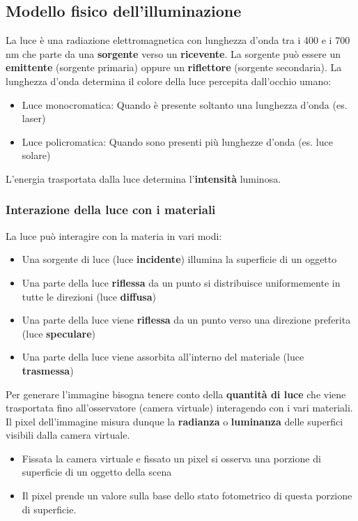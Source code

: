 \documentclass[a4paper]{article}
\begin{document}
\subsection{Modello fisico dell'illuminazione}
La luce è una radiazione elettromagnetica con lunghezza d'onda tra i 400 e i 700 nm che
parte da una \textbf{sorgente} verso un \textbf{ricevente}. La sorgente può essere
un \textbf{emittente} (sorgente primaria) oppure un \textbf{riflettore} (sorgente secondaria).
La lunghezza d'onda determina il colore della luce percepita dall'occhio umano:
\begin{itemize}
  \item Luce monocromatica: Quando è presente soltanto una lunghezza d'onda (es.
    laser)

  \item Luce policromatica: Quando sono presenti più lunghezze d'onda (es. luce solare)
\end{itemize}
L'energia trasportata dalla luce determina l'\textbf{intensità} luminosa.

\subsubsection{Interazione della luce con i materiali}
La luce può interagire con la materia in vari modi:
\begin{itemize}
  \item Una sorgente di luce (luce \textbf{incidente}) illumina la superficie di un oggetto
  \item Una parte della luce \textbf{riflessa} da un punto si distribuisce uniformemente in
    tutte le direzioni (luce \textbf{diffusa})
  \item Una parte della luce viene \textbf{riflessa} da un punto verso una direzione preferita
    (luce \textbf{speculare})
  \item Una parte della luce viene assorbita all'interno del materiale (luce \textbf{trasmessa})
\end{itemize}
Per generare l'immagine bisogna tenere conto della \textbf{quantità di luce} che viene
trasportata fino all'osservatore (camera virtuale) interagendo con i vari materiali.
Il pixel dell'immagine misura dunque la \textbf{radianza} o \textbf{luminanza} delle
superfici visibili dalla camera virtuale.
\begin{itemize}
  \item Fissata la camera virtuale e fissato un pixel si osserva una porzione di superficie
    di un oggetto della scena
  \item Il pixel prende un valore sulla base dello stato fotometrico di questa porzione di
    superficie.
\end{itemize}
\end{document}
